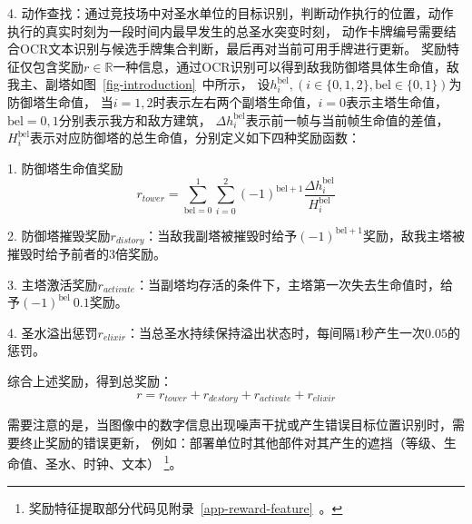 4. 动作查找：通过竞技场中对圣水单位的目标识别，判断动作执行的位置，动作执行的真实时刻为一段时间内最早发生的总圣水突变时刻，
动作卡牌编号需要结合OCR文本识别与候选手牌集合判断，最后再对当前可用手牌进行更新。
奖励特征仅包含奖励$r\in\mathbb{R}$一种信息，通过OCR识别可以得到敌我防御塔具体生命值，敌我主、副塔如图~\ref{fig-introduction}~中所示，
设$h_{i}^{\text{bel}}, (i\in\{0,1,2\},\text{bel}\in\{0,1\})$为防御塔生命值，
当$i=1,2$时表示左右两个副塔生命值，$i=0$表示主塔生命值，$\text{bel}=0,1$分别表示我方和敌方建筑，
$\Delta h_{i}^{\text{bel}}$表示前一帧与当前帧生命值的差值，$H_{i}^{\text{bel}}$表示对应防御塔的总生命值，分别定义如下四种奖励函数：

1. 防御塔生命值奖励
\begin{equation}
  r_{tower} = \sum_{\text{bel}=0}^1\sum_{i=0}^2(-1)^{\text{bel}+1}\frac{\Delta h_{i}^{\text{bel}}}{H_{i}^{\text{bel}}}
\end{equation}

2. 防御塔摧毁奖励$r_{distory}$：当敌我副塔被摧毁时给予$(-1)^{\text{bel}+1}$奖励，敌我主塔被摧毁时给予前者的$3$倍奖励。

3. 主塔激活奖励$r_{activate}$：当副塔均存活的条件下，主塔第一次失去生命值时，给予$(-1)^{\text{bel}}~0.1$奖励。

4. 圣水溢出惩罚$r_{elixir}$：当总圣水持续保持溢出状态时，每间隔$1$秒产生一次$0.05$的惩罚。

综合上述奖励，得到总奖励：
\begin{equation}\label{eq-reward}
  r = r_{tower} + r_{destory} + r_{activate} + r_{elixir}
\end{equation}

需要注意的是，当图像中的数字信息出现噪声干扰或产生错误目标位置识别时，需要终止奖励的错误更新，
例如：部署单位时其他部件对其产生的遮挡（等级、生命值、圣水、时钟、文本）
\footnote{奖励特征提取部分代码见附录~\ref{app-reward-feature}~。}。
